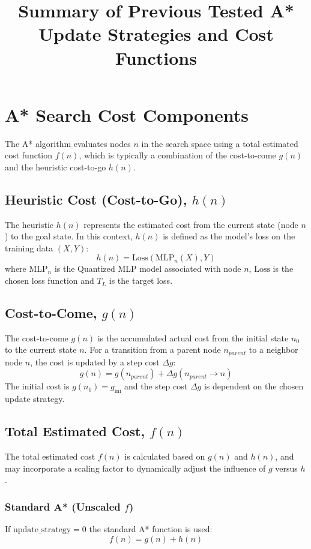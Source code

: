 \documentclass{article}
\title{Summary of Previous Tested A* Update Strategies and Cost Functions}
\date{}
\begin{document}
\maketitle


\section{A* Search Cost Components}

The A* algorithm evaluates nodes $n$ in the search space using a total estimated cost function $f(n)$, which is typically a combination of the cost-to-come $g(n)$ and the heuristic cost-to-go $h(n)$.

\subsection{Heuristic Cost (Cost-to-Go), $h(n)$}
The heuristic $h(n)$ represents the estimated cost from the current state (node $n$) to the goal state. In this context, $h(n)$ is defined as the model's loss on the training data $(X, Y)$:
$$h(n) = \text{Loss}(\text{MLP}_n(X), Y)$$
where $\text{MLP}_n$ is the Quantized MLP model associated with node $n$, $\text{Loss}$ is the chosen loss function and $T_L$ is the target loss.

\subsection{Cost-to-Come, $g(n)$}
The cost-to-come $g(n)$ is the accumulated actual cost from the initial state $n_0$ to the current state $n$. For a transition from a parent node $n_{parent}$ to a neighbor node $n$, the cost is updated by a step cost $\Delta g$:
$$g(n) = g(n_{parent}) + \Delta g(n_{parent} \to n)$$
The initial cost is $g(n_0) = g_{\text{ini}}$ and the step cost $\Delta g$ is dependent on the chosen update strategy.

\subsection{Total Estimated Cost, $f(n)$}
The total estimated cost $f(n)$ is calculated based on $g(n)$ and $h(n)$, and may incorporate a scaling factor to dynamically adjust the influence of $g$ versus $h$.

\subsubsection{Standard A* (Unscaled $f$)}
If $\text{update\_strategy} = 0$ the standard A* function is used:
$$f(n) = g(n) + h(n)$$
\end{document}
